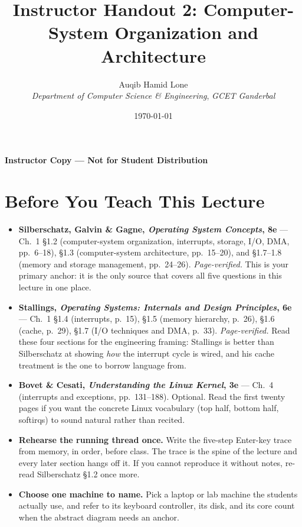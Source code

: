 \documentclass[11pt]{article}
\title{Instructor Handout 2: Computer-System Organization and Architecture}
\author{Auqib Hamid Lone\\[0.3em]
  \emph{Department of Computer Science \& Engineering}, \emph{GCET Ganderbal}}
\date{\today}
\begin{document}
\setlength{\emergencystretch}{2em}
\maketitle
{\centering\large\color{negative}\textbf{Instructor Copy --- Not for Student Distribution}\par}
\vspace{0.5cm}

\section{Before You Teach This Lecture}

\begin{itemize}
  \item \textbf{Silberschatz, Galvin \& Gagne, \textit{Operating System Concepts}, 8e}
    --- Ch.~1 \S1.2 (computer-system organization, interrupts, storage, I/O, DMA,
    pp.~6--18), \S1.3 (computer-system architecture, pp.~15--20), and \S1.7--1.8
    (memory and storage management, pp.~24--26). \emph{Page-verified.} This is
    your primary anchor: it is the only source that covers all five questions in
    this lecture in one place.
  \item \textbf{Stallings, \textit{Operating Systems: Internals and Design
    Principles}, 6e} --- Ch.~1 \S1.4 (interrupts, p.~15), \S1.5 (memory hierarchy,
    p.~26), \S1.6 (cache, p.~29), \S1.7 (I/O techniques and DMA, p.~33).
    \emph{Page-verified.} Read these four sections for the engineering framing:
    Stallings is better than Silberschatz at showing \emph{how} the interrupt
    cycle is wired, and his cache treatment is the one to borrow language from.
  \item \textbf{Bovet \& Cesati, \textit{Understanding the Linux Kernel}, 3e} ---
    Ch.~4 (interrupts and exceptions, pp.~131--188). Optional. Read the first
    twenty pages if you want the concrete Linux vocabulary (top half, bottom
    half, softirqs) to sound natural rather than recited.
  \item \textbf{Rehearse the running thread once.} Write the five-step Enter-key
    trace from memory, in order, before class. The trace is the spine of the
    lecture and every later section hangs off it. If you cannot reproduce it
    without notes, re-read Silberschatz \S1.2 once more.
  \item \textbf{Choose one machine to name.} Pick a laptop or lab machine the
    students actually use, and refer to its keyboard controller, its disk, and
    its core count when the abstract diagram needs an anchor.

\end{itemize}
\end{document}
